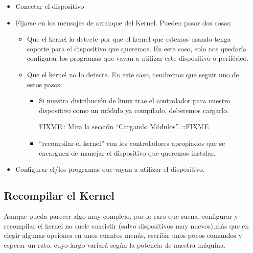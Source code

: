 \begin{itemize}

\item Conectar el dispositivo

\item Fijarse en los mensajes de arranque del Kernel.  Pueden pasar dos cosas:

\begin{itemize}

\item Que el  kernel lo detecte por que el  kernel que estemos usando 
tenga soporte  para el dispositivo  que queremos. En este  caso, solo 
nos  quedaría configurar  los  programas que  vayan  a utilizar  este 
dispositivo o periférico.                                             

\item Que el kernel no lo  detecte. En este caso, tendremos que seguir
uno de estos pasos:

\begin{itemize}

\item  Si  nuestra distribución  de  linux  trae el  controlador  para
nuestro dispositivo como un módulo ya compilado, deberemos cargarlo.

\Large{FIXME:: Mira la sección ``Cargando Módulos''. ::FIXME}

\item ``recompilar  el kernel'' con los  controladores apropiados que 
se encarguen de manejar el dispositivo que queremos instalar.         

\end{itemize}

\end{itemize}

\item Configurar el/los programas que vayan a utilizar el dispositivo.	

\end{itemize}

\subsection{Recompilar el Kernel}

Aunque  pueda  parecer algo  muy  complejo,  por  lo raro  que  suena,
configurar  y   recompilar  el   kernel  no  suele   consistir  (salvo
dispositivos muy  nuevos),más que en  elegir algunas opciones  en unos
cuantos menús,  escribir unos pocos  comandos y esperar un  rato, cuyo
largo variará según la potencia de nuestra máquina.

